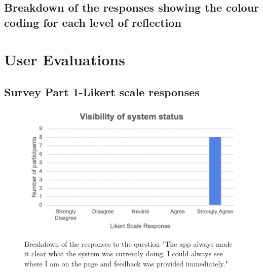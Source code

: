 \documentclass{l4proj}
\begin{document}
\begin{appendices}
\subsection{Breakdown of the responses showing the colour coding for each level of reflection}





\section{User Evaluations} \label{Appendix-UserEvals}

\subsection{Survey Part 1-Likert scale responses}

\begin{figure}[H]
    \begin{centering}
    \includegraphics[scale=0.5]{images/heuristic1.pdf}
    \caption{Breakdown of the responses to the question "The app always made it clear what the system was currently doing. I could always see where I am on the page and feedback was provided immediately."}
    \label{fig: heuristic1}
    \end{centering}
\end{figure}


\end{appendices}
\end{document}
